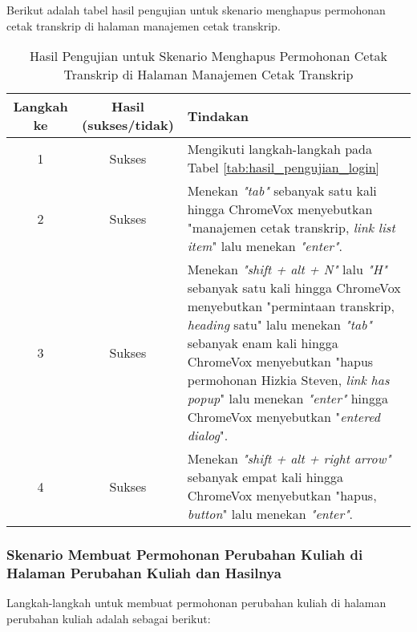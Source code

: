 Berikut adalah tabel hasil pengujian untuk skenario menghapus permohonan cetak transkrip di halaman manajemen cetak transkrip.

\begin{table}[H]
    \centering 
    \caption{Hasil Pengujian untuk Skenario Menghapus Permohonan Cetak Transkrip di Halaman Manajemen Cetak Transkrip}
    \label{tab:hasil_pengujian_menghapus_permohonan_cetak_transkrip_di_halaman_manajemen_cetak_transkrip}
    \begin{tabular}{|c|c|p{10cm}|}
        \toprule
        Langkah ke & Hasil (sukses/tidak) & Tindakan \\

        \midrule
        1 & Sukses & Mengikuti langkah-langkah pada Tabel \ref{tab:hasil_pengujian_login} \\
        2 & Sukses & Menekan \textit{"tab"} sebanyak satu kali hingga ChromeVox menyebutkan "manajemen cetak transkrip, \textit{link list item}" lalu menekan \textit{"enter"}. \\
        3 & Sukses & Menekan \textit{"shift + alt + N"} lalu \textit{"H"} sebanyak satu kali hingga ChromeVox menyebutkan "permintaan transkrip, \textit{heading} satu" lalu menekan \textit{"tab"} sebanyak enam kali hingga ChromeVox menyebutkan "hapus permohonan Hizkia Steven, \textit{link has popup}" lalu menekan \textit{"enter"} hingga ChromeVox menyebutkan "\textit{entered dialog}". \\
        4 & Sukses & Menekan \textit{"shift + alt + right arrow"} sebanyak empat kali hingga ChromeVox menyebutkan "hapus, \textit{button}" lalu menekan \textit{"enter"}. \\ 

        \bottomrule

    \end{tabular}
\end{table}

\subsubsection{Skenario Membuat Permohonan Perubahan Kuliah di Halaman Perubahan Kuliah dan Hasilnya}
\label{subsubsec:skenario_membuat_permohonan_perubahan_kuliah_di_halaman_perubahan_kuliah}
Langkah-langkah untuk membuat permohonan perubahan kuliah di halaman perubahan kuliah adalah sebagai berikut:

